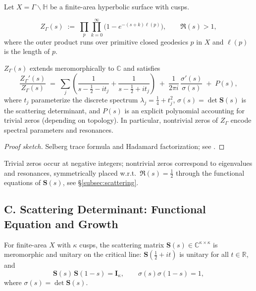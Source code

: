 Let $X=\Gamma\backslash\mathbb H$ be a finite-area hyperbolic surface with cusps.

\begin{definition}
\label{def:selberg-zeta}
\[
  Z_\Gamma(s) \;:=\; \prod_{p}\prod_{k=0}^{\infty}\Big(1-e^{-(s+k)\ell(p)}\Big),
  \qquad \Re(s)>1,
\]
where the outer product runs over primitive closed geodesics $p$ in $X$ and $\ell(p)$ is the length of $p$.
\end{definition}

\begin{theorem}
\label{thm:selberg-cont}
$Z_\Gamma(s)$ extends meromorphically to $\mathbb C$ and satisfies
\begin{equation}
\label{eq:Zprime-over-Z}
  \frac{Z_\Gamma'(s)}{Z_\Gamma(s)}
  \;=\;
  \sum_j\left(\frac{1}{s-\tfrac12-it_j} + \frac{1}{s-\tfrac12+it_j}\right)
  \;+\; \frac{1}{2\pi i}\,\frac{\sigma'(s)}{\sigma(s)}
  \;+\; P(s),
\end{equation}
where $t_j$ parameterize the discrete spectrum $\lambda_j=\tfrac14+t_j^2$, $\sigma(s)=\det\mathbf S(s)$ is the scattering determinant, and $P(s)$ is an explicit polynomial accounting for trivial zeros (depending on topology). In particular, nontrivial zeros of $Z_\Gamma$ encode spectral parameters and resonances. 
\end{theorem}

\begin{proof}[Proof sketch]
Selberg trace formula and Hadamard factorization; see \cite{Selberg1956,Hejhal1983,Hejhal1983II}.
\end{proof}

\begin{remark}
Trivial zeros occur at negative integers; nontrivial zeros correspond to eigenvalues and resonances, symmetrically placed w.r.t.\ $\Re(s)=\tfrac12$ through the functional equations of $\mathbf S(s)$, see \S\ref{subsec:scattering}.
\end{remark}


\subsection*{C. Scattering Determinant: Functional Equation and Growth}
\label{subsec:scattering}

\begin{theorem}
\label{thm:scatt-fe}
For finite-area $X$ with $\kappa$ cusps, the scattering matrix $\mathbf S(s)\in\mathbb C^{\kappa\times\kappa}$ is meromorphic and unitary on the critical line: $\mathbf S(\tfrac12+it)$ is unitary for all $t\in\mathbb R$, and
\[
  \mathbf S(s)\,\mathbf S(1-s) = \mathbf I_\kappa,\qquad \sigma(s)\sigma(1-s)=1,
\]
where $\sigma(s)=\det\mathbf S(s)$.
\end{theorem}

